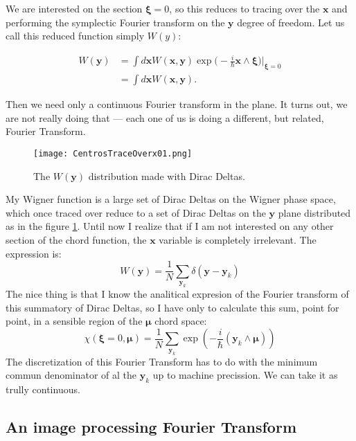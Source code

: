 \documentclass[a4paper,12pt]{article}
\newcommand{\ihb}{\frac{i}{\hbar}}
\newcommand{\xfase}{\mathbf{x}}
\newcommand{\yfase}{\mathbf{y}}
\newcommand{\xifase}{ {\boldsymbol{\xi}} }
\newcommand{\mufase}{ {\boldsymbol{\mu}} }
\begin{document}
We are interested on the section $\xifase=0$, so this reduces to tracing over
the $\xfase$ and performing the symplectic Fourier transform on the 
$\yfase$ degree of freedom. Let us call this reduced function simply $W(y)$:

\begin{align}
W(\yfase) &=\int d\xfase
W(\xfase,\yfase)\exp \big(-\ihb \xfase\wedge \xifase \big) \rvert_{\xifase=0} \\ 
&=\int d\xfase 
W(\xfase,\yfase).
\end{align}

Then we need only a continuous Fourier transform in the plane.
It turns out, we are not really doing that --- 
each one of us is doing a different,
but related, Fourier Transform.

\begin{figure}[h]
\centering
\texttt{[image: CentrosTraceOverx01.png]}
\caption{The $W(\yfase)$ distribution made with Dirac Deltas.}
\label{karelwignerfun}
\end{figure}

My Wigner function is a large set of Dirac Deltas on the Wigner phase space, which 
once traced over reduce to a set of Dirac Deltas on the $\yfase$ plane distributed
as in the figure \ref{karelwignerfun}. Until now I realize that
if I am not interested on any other section of the
chord function, the $\xfase$ variable is completely irrelevant.
 The expression is:
\begin{equation}
W(\yfase)=\frac{1}{N}\sum_{\yfase_k} \delta(\yfase-\yfase_k)
\end{equation}
The nice thing is that I know the analitical expresion of the Fourier transform of
this summatory of Dirac Deltas, so I have only to calculate this sum,
point for point, in a sensible region of the $\mufase$ chord space:
\begin{equation}
\chi(\xifase=0, \mufase)=\frac{1}{N}\sum_{\yfase_k} \exp (-\ihb (\yfase_k\wedge\mufase))
\end{equation}
The discretization of this Fourier Transform  has to do with the minimum commun
denominator of al the $\yfase_k$ up to machine precission. We can take it as trully
continuous.

\subsection{An image processing Fourier Transform}
\end{document}
